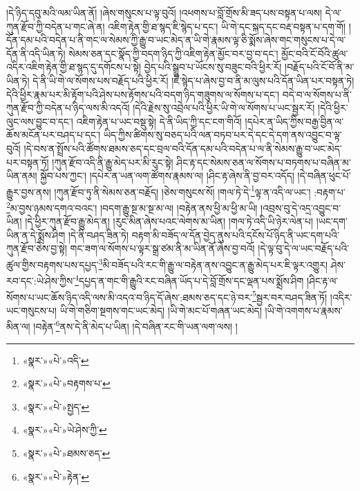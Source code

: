 །དེ་ཉིད་དབུ་མའི་ལམ་ཡིན་ནོ། །ཞེས་གསུངས་པ་ལྟ་བུའོ། །འཕགས་པ་བློ་གྲོས་མི་ཟད་པས་བསྟན་པ་ལས། དེ་ལ་ཀུན་རྫོབ་ཀྱི་བདེན་པ་གང་ཞེ་ན། འཇིག་རྟེན་གྱི་ཐ་སྙད་ཇི་སྙེད་པ་དང་། ཡི་གེ་དང་སྐད་དང་བརྡ་བསྟན་པ་དག་གོ། །དོན་དམ་པའི་བདེན་པ་ནི་གང་ལ་སེམས་ཀྱི་རྒྱུ་བ་ཡང་མེད་ན་ཡི་གེ་རྣམས་ལྟ་ཅི་སྨོས་ཞེས་གང་གསུངས་པ་དེ་ལ་དོན་ནི་འདི་ཡིན་ཏེ། སེམས་ཅན་དང་སྣོད་ཀྱི་བདག་ཉིད་ཀྱི་འཇིག་རྟེན་མྱོང་བར་བྱ་བ་དང་། མྱོང་བའི་ངོ་བོའི་ཚུལ་འདིར་འཇིག་རྟེན་གྱི་ཐ་སྙད་དུ་དགོངས་པ་སྟེ། བྱེད་པའི་སྒྲུབ་པ་ཡོངས་སུ་བཟུང་བའི་ཕྱིར་རོ། །བརྗོད་པའི་ངོ་བོ་ནི་མ་ཡིན་ཏེ། དེ་ནི་ཡི་གེ་ལ་སོགས་པས་བརྗོད་པའི་ཕྱིར་རོ། །ཇི་སྙེད་པ་ཞེས་བྱ་བ་ནི་མ་ལུས་པའི་དོན་ཡིན་པར་བསྟན་ཏེ། དེའི་ཕྱིར་རྣམ་པར་མི་རྟོག་པའི་ཤེས་པས་རྟོགས་པའི་བདག་ཉིད་གཟུགས་ལ་སོགས་པ་དང་། བདེ་བ་ལ་སོགས་པ་ནི་ཀུན་རྫོབ་ཀྱི་བདེན་པ་ཉིད་ལས་མི་འདའོ། །དེའི་རྗེས་སུ་འབྲེལ་པའི་ཕྱིར་ཡི་གེ་ལ་སོགས་པ་ཡང་སྦྱར་རོ། །དེའི་ཕྱིར་ལུང་ལས་བྱུང་བ་དང་། འཇིག་རྟེན་པ་ཡང་བསྡུ་སྟེ། དེ་ནི་ཡིད་ཀྱི་དང་ངག་གིའོ། །དཔེར་ན་ཡིད་ཀྱིས་བརྒྱ་བྱིན་ལ་ཆོས་མངོན་པར་བཤད་པ་དང་། ཡིད་ཀྱིས་ཚིགས་སུ་བཅད་པའི་ལན་བཏབ་པར་དེ་དང་དེ་དག་ནས་འབྱུང་བ་ལྟ་བུའོ། །དེ་བས་ན་སྤྲོས་པའི་ཚོགས་ཐམས་ཅད་དང་བྲལ་བའི་དོན་དམ་པའི་བདེན་པ་ལ་ནི་སེམས་རྒྱུ་བ་ཡང་མེད་པར་བསྟན་ཏོ། །ཀུན་རྫོབ་འདི་ནི་རྒྱུ་མེད་པར་མི་རུང་སྟེ། ཤིང་རྟ་དང་སེམས་ཅན་ལ་སོགས་པ་བཏགས་པ་བཞིན་མ་ཡིན་ནམ། སྐྱོབ་པས་ཀྱང་། །དཔེར་ན་ཡན་ལག་ཚོགས་རྣམས་ལ། །ཤིང་རྟ་ཞེས་ནི་བྱ་བར་འདོད། །དེ་བཞིན་ཕུང་པོ་རྒྱུར་བྱས་ནས། །ཀུན་རྫོབ་ཏུ་ནི་སེམས་ཅན་བརྗོད། །ཅེས་གསུངས་སོ། །གལ་ཏེ་དེ་\footnote{«སྣར་»«པེ་»འདི་}ལྟ་ན་འདི་ལ་ཡང་། :བརྟག་པ་\footnote{«སྣར་»«པེ་»བརྟགས་པ་}མ་བྱས་ཉམས་དགའ་བའང་། །བདག་རྒྱུ་སྔ་མ་སྔ་མ་ལ། །བརྟེན་ནས་ཕྱི་མ་ཕྱི་མ་ཡི། །འབྲས་བུ་དེ་འདྲ་འབྱུང་བ་ཡིན། །དེ་ཕྱིར་ཀུན་རྫོབ་རྒྱུ་མེད་ན། །རུང་མིན་ཞེས་པའང་ལེགས་མ་ཡིན། །གལ་ཏེ་འདི་ཡི་ཉེར་ལེན་པ། །ཡང་དག་ཡིན་ན་དེ་སྨྲོས་ཤིག །དེ་ནི་བཤད་ཟིན་ཏེ། བརྟག་མི་བཟོད་ལ་དོན་བྱེད་ནུས་པའི་དངོས་པོ་ཉིད་ནི་ཡང་དག་པའི་ཀུན་རྫོབ་ཅེས་བྱ་སྟེ། གང་ཟག་ལ་སོགས་པ་ལྟར་སྒྲ་ཙམ་ནི་མ་ཡིན་ནོ་ཞེས་བྱ་བའོ། །དེ་ལྟ་བུ་དེ་ལ་ཡང་བརྗོད་པའི་ཚུལ་གྱིས་བརྟགས་པས་དཔྱད་\footnote{«སྣར་»«པེ་»སྤྱད་}མི་བཟོད་པའི་རང་གི་རྒྱུ་ལ་བརྟེན་ནས་འབྱུང་ན་རྒྱུ་མེད་པར་ཇི་ལྟར་འགྱུར། ཤེས་རབ་དང་:ཡེ་ཤེས་ཀྱིས་\footnote{«སྣར་»«པེ་»ཡེ་ཤེས་ཀྱི་}དཔྱད་ན་གང་གི་རྒྱུའི་རང་བཞིན་ཡོད་པ་དེ་བློ་གྲོས་དང་ལྡན་པས་སྨྲོས་ཤིག །ཤིང་རྟ་ལ་སོགས་པ་ཡང་ཆོས་ཉིད་འདི་ལས་མི་འདའ་བ་ཉིད་དོ་ཞེས་:ཐམས་ཅད་དང་ཉེ་བར་\footnote{«སྣར་»«པེ་»ཐམས་ཅད་}སྦྱར་བར་བཤད་ཟིན་ཏོ། །འདིར་ཡང་གསུངས་པ། ཡི་གེ་གཅིག་སྔགས་གང་ཡང་མེད། །ཡི་གེ་མང་པོ་གཞན་ཡང་མེད། །ཡི་གེ་འགགས་པ་རྣམས་མིན་ལ། །བརྟེན་\footnote{«སྣར་»«པེ་»རྟེན་}ནས་དེ་ནི་མེད་པ་ཡིན། །དེ་བཞིན་རང་གི་ཡན་ལག་ལས། །
